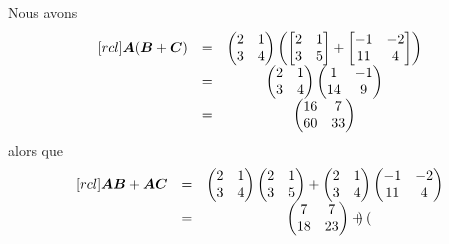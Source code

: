 \begin{exemple}
     Nous avons
        \[
        \begin{matrix}[rcl]
            \boldsymbol{A}(\boldsymbol{B}+\boldsymbol{C}) &=& \begin{pmatrix}
			    2 & 1 \\
			    3 & 4
			    \end{pmatrix}
			  \left(
            \begin{bmatrix}
		    2 & 1 \\
		    3 & 5
		    \end{bmatrix} +
		    \begin{bmatrix}
		    -1 & -2 \\
		    11 & 4
		    \end{bmatrix} \right)\\
		    &=& 
		    \begin{pmatrix}
		    2 & 1 \\
		    3 & 4
		    \end{pmatrix}
		    \begin{pmatrix}
		    1 & -1 \\
		    14 & 9
		    \end{pmatrix} \\
		    &=&
		    \begin{pmatrix}
		    16 & 7 \\
		    60 & 33
		    \end{pmatrix}
        \end{matrix}
        \]
    alors que
    \[
    \begin{matrix}[rcl]
    \boldsymbol{A}\boldsymbol{B} + \boldsymbol{A}\boldsymbol{C} &=&
    \begin{pmatrix}
    2 & 1 \\
    3 & 4
    \end{pmatrix}
    \begin{pmatrix}
    2 & 1 \\
    3 & 5
    \end{pmatrix}
    +
    \begin{pmatrix}
    2 & 1\\
    3 & 4
    \end{pmatrix}
    \begin{pmatrix}
    -1 & -2 \\
    11 & 4
    \end{pmatrix} \\
    &=&
    \begin{pmatrix}
    7 & 7 \\
    18 & 23
    \end{pmatrix}
    +
    \begin{pmatrix}

\end{pmatrix}
\end{matrix}\]
\end{exemple}
